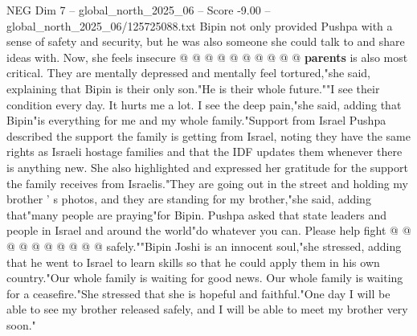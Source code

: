 \begin{textsample}{NEG Dim 7 – global\_north\_2025\_06 – Score -9.00 – global\_north\_2025\_06/125725088.txt}
Bipin not only provided Pushpa with a sense of safety and security, but he was also someone she could talk to and share ideas with.
Now, she feels insecure @ @ @ @ @ @ @ @ @ @ \textbf{parents} is also most critical.
They are mentally depressed and mentally feel tortured,"she said, explaining that Bipin is their only son."He is their whole future.""I see their condition every day.
It hurts me a lot.
I see the deep pain,"she said, adding that Bipin"is everything for me and my whole family."Support from Israel Pushpa described the support the family is getting from Israel, noting they have the same rights as Israeli hostage families and that the IDF updates them whenever there is anything new.
She also highlighted and expressed her gratitude for the support the family receives from Israelis."They are going out in the street and holding my brother ' s photos, and they are standing for my brother,"she said, adding that"many people are praying"for Bipin.
Pushpa asked that state leaders and people in Israel and around the world"do whatever you can.
Please help fight @ @ @ @ @ @ @ @ @ @ safely.""Bipin Joshi is an innocent soul,"she stressed, adding that he went to Israel to learn skills so that he could apply them in his own country."Our whole family is waiting for good news.
Our whole family is waiting for a ceasefire."She stressed that she is hopeful and faithful."One day I will be able to see my brother released safely, and I will be able to meet my brother very soon."

\end{textsample}
